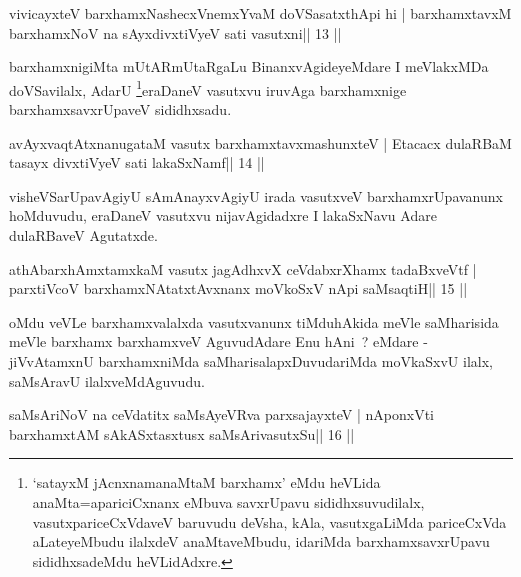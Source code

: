 
\begin{shl}
vivicayxteV barxhamxNashecxVnemxYvaM doVSasatxthA\s pi hi |
barxhamxtavxM barxhamxNoV na sAyxdivxtiVyeV sati vasutxni\hfill || 13 ||
\end{shl}

\begin{artha}
barxhamxnigiMta mUtARmUtaRgaLu BinanxvAgideyeMdare I meVlakxMDa
doVSavilalx, AdarU \footnote{`satayxM jAcnxnamanaMtaM barxhamx'
 eMdu heVLida anaMta=apariciCxnanx eMbuva savxrUpavu
 sididhxsuvudilalx, vasutxpariceCxVdaveV baruvudu deVsha, kAla,
 vasutxgaLiMda pariceCxVda aLateyeMbudu ilalxdeV anaMtaveMbudu,
 idariMda barxhamxsavxrUpavu sididhxsadeMdu heVLidAdxre.}eraDaneV 
 vasutxvu iruvAga barxhamxnige barxhamxsavxrUpaveV sididhxsadu.
\end{artha}


\begin{shl}
avAyxvaqtAtxnanugataM vasutx barxhamxtavxmashunxteV |
Etacacx dulaRBaM tasayx divxtiVyeV sati lakaSxNamf\hfill || 14 ||
\end{shl}

\begin{artha}
visheVSarUpavAgiyU sAmAnayxvAgiyU irada vasutxveV barxhamxrUpavanunx hoMduvudu, eraDaneV vasutxvu nijavAgidadxre I lakaSxNavu Adare dulaRBaveV Agutatxde.
\end{artha}


\begin{shl}
athAbarxhAmxtamxkaM vasutx jagAdhxvX ceVdabxrXhamx tadaBxveVtf |
parxtiVcoV barxhamxNA\s tatxtAvxnanx moVkoSxV nApi saMsaqtiH\hfill || 15 ||
\end{shl}

\begin{artha}
oMdu veVLe barxhamxvalalxda vasutxvanunx tiMduhAkida meVle saMharisida meVle barxhamx barxhamxveV AguvudAdare Enu hAni~? eMdare - jiVvAtamxnU barxhamxniMda saMharisalapxDuvudariMda moVkaSxvU ilalx, saMsAravU ilalxveMdAguvudu.
\end{artha}

\begin{shl}
saMsAriNoV na ceVdatitx saMsAyeVRva parxsajayxteV |
nA\s ponxVti barxhamxtAM sAkASxtasxtusx saMsArivasutxSu\hfill || 16 ||
\end{shl}

